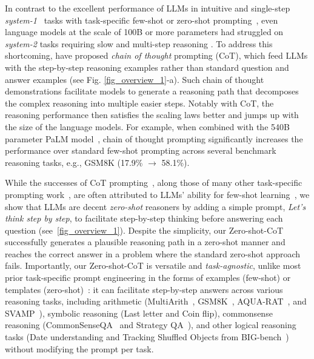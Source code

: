 \documentclass{article}
\newcommand{\yi}[1]{{\color{magenta}[{#1} --YI]}}
\newcommand{\CoT}{chain of thought\xspace}
\newcommand{\ours}{Zero-shot-CoT\xspace}
\begin{document}
In contrast to the excellent performance of LLMs in intuitive and single-step \textit{system-1}~\citep{stanovich2000individual} tasks with task-specific few-shot or zero-shot prompting~\citep{liu2021pre}, even language models at the scale of 100B or more parameters had struggled on \textit{system-2} tasks requiring slow and multi-step reasoning \citep{gopher}. 
To address this shortcoming, \citet{cot_wei, cot_wei_sc} have proposed \textit{\CoT} prompting (CoT), which feed LLMs with the step-by-step reasoning examples rather than standard question and answer examples (see Fig. \ref{fig_overview_1}-a). 
Such \CoT demonstrations facilitate models to generate a reasoning path that decomposes the complex reasoning into multiple easier steps. 
Notably with CoT, the reasoning performance then satisfies the scaling laws better and jumps up with the size of the language models. For example, when combined with the 540B parameter PaLM model~\citep{palm}, \CoT prompting significantly increases the performance over standard few-shot prompting across several benchmark reasoning tasks, e.g., GSM8K (17.9\% $\rightarrow$ 58.1\%). 

While the successes of CoT prompting~\citep{cot_wei}, along those of many other task-specific prompting work~\citep{gao2021making,schick2020s,liu2021pre}, are often attributed to LLMs' ability for few-shot learning~\citep{brown2020language}, we show that LLMs are decent \textit{zero-shot} reasoners by adding a simple prompt, \textit{Let's think step by step}, to facilitate step-by-step thinking before answering each question (see~\autoref{fig_overview_1}). 
Despite the simplicity, our \ours successfully generates a plausible reasoning path in a zero-shot manner and reaches the correct answer in a problem where the standard zero-shot approach fails. 
Importantly, our \ours is versatile and \textit{task-agnostic}, unlike most prior task-specific prompt engineering in the forms of examples (few-shot) or templates (zero-shot)~\citep{liu2021pre}: 
it can facilitate step-by-step answers across various reasoning tasks, including arithmetic (MultiArith~\citep{multiarith}, GSM8K~\citep{gsm8k}, AQUA-RAT~\citep{aqua}, and SVAMP~\citep{svamp}), symbolic reasoning (Last letter and Coin flip), commonsense reasoning (CommonSenseQA~\citep{commonsenseqa} and Strategy QA~\citep{strategyqa}), and other logical reasoning tasks (Date understanding and Tracking Shuffled Objects from BIG-bench~\citep{bigbench}) without modifying the prompt per task.
\end{document}
